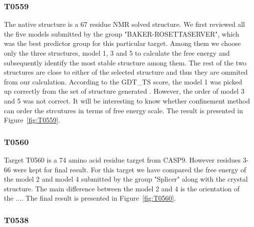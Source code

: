 \documentclass[12pt]{article}
\begin{document}


\subsubsection{T0559}

The native structure is a  67 residue NMR solved structure. We first reviewed all the five models
submitted by the group "BAKER-ROSETTASERVER", which was the best predictor group for this particular
target.  Among them we choose only the three structures, model 1, 3 and 5 to calculate the free
energy and subsequently identify the most stable structure among them. The rest of the two
structures are close to either of the selected structure and thus they are ommited from our
calculation. According to the GDT\_TS score, the model 1 was picked up correctly from the set of
structure generated . However, the order of model 3 and 5 was not correct.
It will be interesting to know whether confinement method can order the strcutures in terms
of free energy scale. The result is presented in Figure~\ref{fig:T0559}.


\subsubsection{T0560}

Target T0560 is a 74 amino acid residue target from CASP9. However residues 3-66 were kept for final
result.  For this target we have compared the free energy of the model 2 and model 4 submitted by
the group "Splicer" along with the crystal structure.  The main difference between the model 2 and 4
is the orientation of the ....  The final result is presented in Figure~\ref{fig:T0560}.

\subsubsection{T0538}
\end{document}
